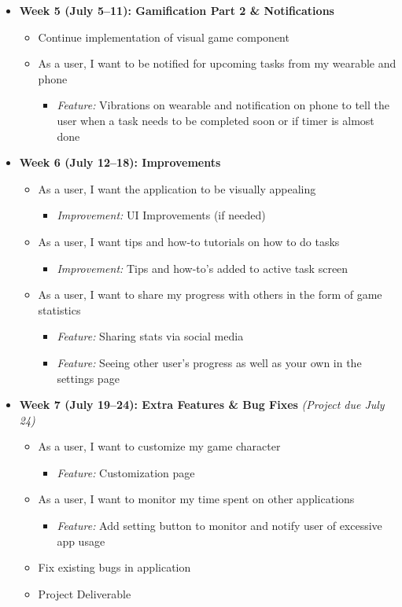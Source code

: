 \documentclass[12pt,letterpaper]{article}
\begin{document}
\begin{itemize}
  \item \textbf{Week 5 (July 5--11): Gamification Part 2 \& Notifications}
  \begin{itemize}
    \item Continue implementation of visual game component
    \item As a user, I want to be notified for upcoming tasks from my wearable and phone
    \begin{itemize}
      \item \textit{Feature:} Vibrations on wearable and notification on phone to tell the user when a task needs to be completed soon or if timer is almost done
    \end{itemize}
  \end{itemize}
  
  \item \textbf{Week 6 (July 12--18): Improvements}
  \begin{itemize}
    \item As a user, I want the application to be visually appealing
    \begin{itemize}
      \item \textit{Improvement:} UI Improvements (if needed)
    \end{itemize}
    \item As a user, I want tips and how-to tutorials on how to do tasks
    \begin{itemize}
      \item \textit{Improvement:} Tips and how-to’s added to active task screen
    \end{itemize}
    \item As a user, I want to share my progress with others in the form of game statistics
    \begin{itemize}
      \item \textit{Feature:} Sharing stats via social media
      \item \textit{Feature:} Seeing other user’s progress as well as your own in the settings page
    \end{itemize}
  \end{itemize}
  
  \item \textbf{Week 7 (July 19--24): Extra Features \& Bug Fixes} \textit{(Project due July 24)}
  \begin{itemize}
    \item As a user, I want to customize my game character
    \begin{itemize}
      \item \textit{Feature:} Customization page
    \end{itemize}
    \item As a user, I want to monitor my time spent on other applications
    \begin{itemize}
      \item \textit{Feature:} Add setting button to monitor and notify user of excessive app usage
    \end{itemize}
    \item Fix existing bugs in application
    \item Project Deliverable
  \end{itemize}


\end{itemize}
\end{document}
